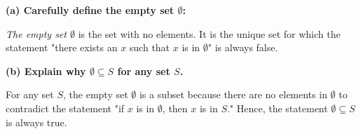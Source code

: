 
\textbf{(a) Carefully define the empty set \( \emptyset \):}

\textit{The empty set \( \emptyset \)} is the set with no elements. It is the unique set for which the statement "there exists an \( x \) such that \( x \) is in \( \emptyset \)" is always false.

\textbf{(b) Explain why \( \emptyset \subseteq S \) for any set \( S \).}

For any set \( S \), the empty set \( \emptyset \) is a subset because there are no elements in \( \emptyset \) to contradict the statement "if \( x \) is in \( \emptyset \), then \( x \) is in \( S \)." Hence, the statement \( \emptyset \subseteq S \) is always true.
